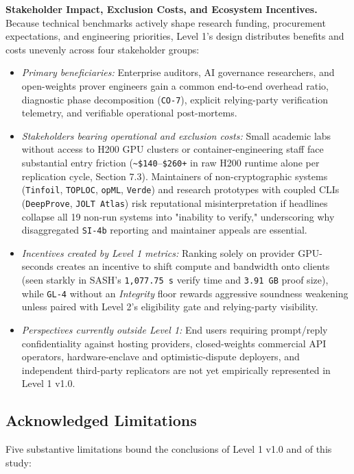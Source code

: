 \documentclass[11pt,letterpaper]{article}
\begin{document}
\textbf{Stakeholder Impact, Exclusion Costs, and Ecosystem Incentives.} Because technical benchmarks actively shape research funding, procurement expectations, and engineering priorities, Level 1's design distributes benefits and costs unevenly across four stakeholder groups:

\begin{itemize}
\item \textit{Primary beneficiaries:} Enterprise auditors, AI governance researchers, and open-weights prover engineers gain a common end-to-end overhead ratio, diagnostic phase decomposition (\texttt{CO-7}), explicit relying-party verification telemetry, and verifiable operational post-mortems.
\item \textit{Stakeholders bearing operational and exclusion costs:} Small academic labs without access to H200 GPU clusters or container-engineering staff face substantial entry friction (\texttt{\textasciitilde{}\$140}--\texttt{\$260+} in raw H200 runtime alone per replication cycle, Section 7.3). Maintainers of non-cryptographic systems (\texttt{Tinfoil}, \texttt{TOPLOC}, \texttt{opML}, \texttt{Verde}) and research prototypes with coupled CLIs (\texttt{DeepProve}, \texttt{JOLT Atlas}) risk reputational misinterpretation if headlines collapse all 19 non-run systems into "inability to verify," underscoring why disaggregated \texttt{SI-4b} reporting and maintainer appeals are essential.
\item \textit{Incentives created by Level 1 metrics:} Ranking solely on provider GPU-seconds creates an incentive to shift compute and bandwidth onto clients (seen starkly in SASH's \texttt{1,077.75 s} verify time and \texttt{3.91 GB} proof size), while \texttt{GL-4} without an \textit{Integrity} floor rewards aggressive soundness weakening unless paired with Level 2's eligibility gate and relying-party visibility.
\item \textit{Perspectives currently outside Level 1:} End users requiring prompt/reply confidentiality against hosting providers, closed-weights commercial API operators, hardware-enclave and optimistic-dispute deployers, and independent third-party replicators are not yet empirically represented in Level 1 v1.0.
\end{itemize}

\subsection{Acknowledged Limitations}

Five substantive limitations bound the conclusions of Level 1 v1.0 and of this study:
\end{document}
